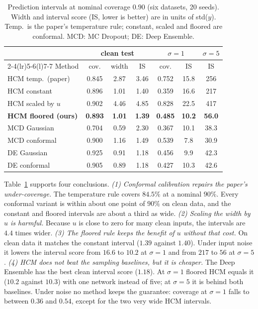\begin{table}[t]
  \centering
  \small
  \setlength{\tabcolsep}{1mm}
  \begin{tabular}{@{}lcccccc@{}}
    \toprule
    & \multicolumn{3}{c}{clean test} & \multicolumn{2}{c}{$\sigma=1$} & $\sigma=5$ \\
    \cmidrule(lr){2-4}\cmidrule(lr){5-6}\cmidrule(l){7-7}
    Method & cov. & width & IS & cov. & IS & IS \\
    \midrule
    HCM temp.\ (paper)         & 0.845 & 2.87 & 3.46 & 0.752 & 15.8 & 256 \\
    HCM constant               & 0.896 & 1.01 & 1.40 & 0.359 & 16.6 & 217 \\
    HCM scaled by $u$          & 0.902 & 4.46 & 4.85 & 0.828 & 22.5 & 417 \\
    \textbf{HCM floored (ours)} & \textbf{0.893} & \textbf{1.01} & \textbf{1.39} & \textbf{0.485} & \textbf{10.2} & \textbf{56.0} \\
    \midrule
    MCD Gaussian               & 0.704 & 0.59 & 2.30 & 0.367 & 10.1 & 38.3 \\
    MCD conformal              & 0.900 & 1.16 & 1.49 & 0.539 & 7.8  & 30.9 \\
    DE Gaussian                & 0.925 & 0.91 & 1.18 & 0.456 & 9.9  & 42.3 \\
    DE conformal               & 0.905 & 0.89 & 1.18 & 0.427 & 10.3 & 42.6 \\
    \bottomrule
  \end{tabular}
  \caption{Prediction intervals at nominal coverage $0.90$ (six datasets, 20 seeds). Width
  and interval score (IS, lower is better) are in units of std($y$). Temp.\ is the paper's
  temperature rule; constant, scaled and floored are conformal. MCD: MC Dropout; DE: Deep
  Ensemble.}
  \label{tab:intervals}
\end{table}

Table~\ref{tab:intervals} supports four conclusions.
\emph{(1) Conformal calibration repairs the paper's under-coverage.} The temperature rule
covers $84.5\%$ at a nominal $90\%$. Every conformal variant is within about one point of
$90\%$ on clean data, and the constant and floored intervals are about a third as wide.
\emph{(2) Scaling the width by $u$ is harmful.} Because $u$ is close to zero for many clean
inputs, the intervals are $4.4$ times wider.
\emph{(3) The floored rule keeps the benefit of $u$ without that cost.} On clean data it
matches the constant interval ($1.39$ against $1.40$). Under input noise it lowers the
interval score from $16.6$ to $10.2$ at $\sigma=1$ and from $217$ to $56$ at $\sigma=5$.
\emph{(4) HCM does not beat the sampling baselines, but it is cheaper.} The Deep Ensemble
has the best clean interval score ($1.18$). At $\sigma=1$ floored HCM equals it ($10.2$
against $10.3$) with one network instead of five; at $\sigma=5$ it is behind both
baselines. Under noise no method keeps the guarantee: coverage at $\sigma=1$ falls to
between $0.36$ and $0.54$, except for the two very wide HCM intervals.

